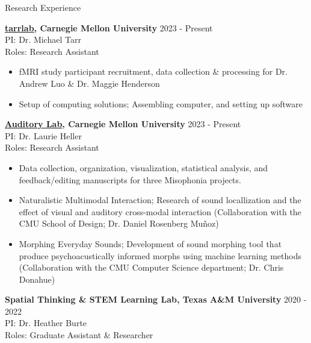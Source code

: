 \documentclass{resume} %
\begin{document}

\begin{rSection}{Research Experience}
	
	{\bf \href{https://sites.google.com/andrew.cmu.edu/tarrlab/}{tarrlab}, Carnegie Mellon University}
	\hfill { 2023 - Present}
	\\PI: Dr. Michael Tarr
	\\Roles: Research Assistant
	
	\begin{itemize}[nosep]
		
		\item fMRI study participant recruitment, data collection \& processing for Dr. Andrew Luo \& Dr. Maggie Henderson
		\item Setup of computing solutions; Assembling computer, and setting up software
	
	\end{itemize}
	
	{\bf \href{https://www.auditorylab.org/}{Auditory Lab}, Carnegie Mellon University}
	\hfill { 2023 - Present}
	\\PI: Dr. Laurie Heller
	\\Roles: Research Assistant
	
	\begin{itemize}[nosep]
		
		\item Data collection, organization, visualization, statistical analysis, and feedback/editing manuscripts for three Misophonia projects.
		\item Naturalistic Multimodal Interaction; Research of sound locallization and the effect of visual and auditory cross-modal interaction (Collaboration with the CMU School of Design; Dr. Daniel Rosenberg Muñoz)
		\item Morphing Everyday Sounds; Development of sound morphing tool that produce psychoacustically informed morphs using machine learning methods (Collaboration with the CMU Computer Science department; Dr. Chris Donahue)
		
	\end{itemize}
    
    {\bf Spatial Thinking \& STEM Learning Lab, 
        Texas A\&M University}
    \hfill { 2020 - 2022}
    \\PI: Dr. Heather Burte
    \\Roles: Graduate Assistant \& Researcher
    

\end{rSection}
\end{document}
